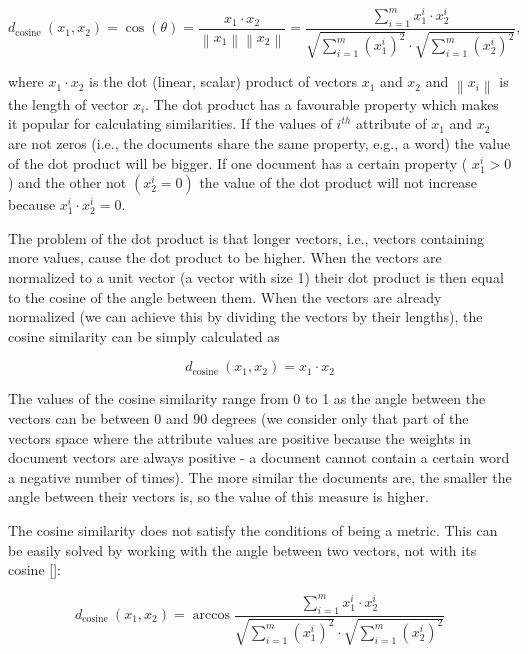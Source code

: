 \begin{equation*}
d_{\text {cosine }}\left(x_{1}, x_{2}\right)=\cos (\theta)=\frac{x_{1} \cdot x_{2}}{\left\|x_{1}\right\|\left\|x_{2}\right\|}=\frac{\sum_{i=1}^{m} x_{1}^{i} \cdot x_{2}^{i}}{\sqrt{\sum_{i=1}^{m}\left(x_{1}^{i}\right)^{2}} \cdot \sqrt{\sum_{i=1}^{m}\left(x_{2}^{i}\right)^{2}}}, \tag{12.4}
\end{equation*}


where $x_{1} \cdot x_{2}$ is the dot (linear, scalar) product of vectors $x_{1}$ and $x_{2}$ and $\left\|x_{i}\right\|$ is the length of vector $x_{i}$. The dot product has a favourable property which makes it popular for calculating similarities. If the values of $i^{t h}$ attribute of $x_{1}$ and $x_{2}$ are not zeros (i.e., the documents share the same property, e.g., a word) the value of the dot product will be bigger. If one document has a certain property ( $x_{1}^{i}>0$ ) and the other not $\left(x_{2}^{i}=0\right)$ the value of the dot product will not increase because $x_{1}^{i} \cdot x_{2}^{i}=0$.

The problem of the dot product is that longer vectors, i.e., vectors containing more values, cause the dot product to be higher. When the vectors are normalized to a unit vector (a vector with size 1) their dot product is then equal to the cosine of the angle between them. When the vectors are already normalized (we can achieve this by dividing the vectors by their lengths), the cosine similarity can be simply calculated as


\begin{equation*}
d_{\text {cosine }}\left(x_{1}, x_{2}\right)=x_{1} \cdot x_{2} \tag{12.5}
\end{equation*}


The values of the cosine similarity range from 0 to 1 as the angle between the vectors can be between 0 and 90 degrees (we consider only that part of the vectors space where the attribute values are positive because the weights in document vectors are always positive - a document cannot contain a certain word a negative number of times). The more similar the documents are, the smaller the angle between their vectors is, so the value of this measure is higher.

The cosine similarity does not satisfy the conditions of being a metric. This can be easily solved by working with the angle between two vectors, not with its cosine [\cite{ref242}]:


\begin{equation*}
d_{\text {cosine }}\left(x_{1}, x_{2}\right)=\arccos \frac{\sum_{i=1}^{m} x_{1}^{i} \cdot x_{2}^{i}}{\sqrt{\sum_{i=1}^{m}\left(x_{1}^{i}\right)^{2}} \cdot \sqrt{\sum_{i=1}^{m}\left(x_{2}^{i}\right)^{2}}} \tag{12.6}
\end{equation*}


